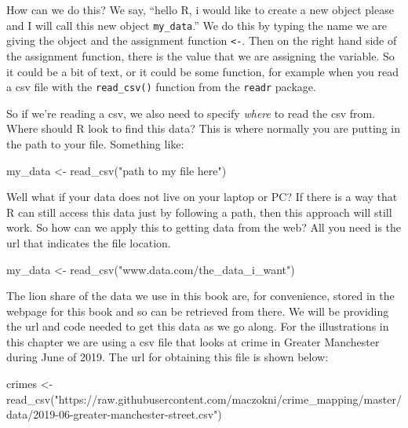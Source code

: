 \documentclass[
]{book}
\newenvironment{Shaded}{\begin{snugshade}}{\end{snugshade}}
\newcommand{\FunctionTok}[1]{\textcolor[rgb]{0.00,0.00,0.00}{#1}}
\newcommand{\NormalTok}[1]{#1}
\newcommand{\OtherTok}[1]{\textcolor[rgb]{0.56,0.35,0.01}{#1}}
\newcommand{\StringTok}[1]{\textcolor[rgb]{0.31,0.60,0.02}{#1}}
\begin{document}
How can we do this? We say, ``hello R, i would like to create a new object please and I will call this new object \texttt{my\_data}.'' We do this by typing the name we are giving the object and the assignment function \texttt{\textless{}-}. Then on the right hand side of the assignment function, there is the value that we are assigning the variable. So it could be a bit of text, or it could be some function, for example when you read a csv file with the \texttt{read\_csv()} function from the \texttt{readr} package.

So if we're reading a csv, we also need to specify \emph{where} to read the csv from. Where should R look to find this data? This is where normally you are putting in the path to your file. Something like:

\begin{Shaded}
\begin{Highlighting}[]
\NormalTok{my\_data }\OtherTok{\textless{}{-}} \FunctionTok{read\_csv}\NormalTok{(}\StringTok{"path to my file here"}\NormalTok{)}
\end{Highlighting}
\end{Shaded}

Well what if your data does not live on your laptop or PC? If there is a way that R can still access this data just by following a path, then this approach will still work. So how can we apply this to getting data from the web? All you need is the url that indicates the file location.

\begin{Shaded}
\begin{Highlighting}[]
\NormalTok{my\_data }\OtherTok{\textless{}{-}} \FunctionTok{read\_csv}\NormalTok{(}\StringTok{"www.data.com/the\_data\_i\_want"}\NormalTok{)}
\end{Highlighting}
\end{Shaded}

The lion share of the data we use in this book are, for convenience, stored in the webpage for this book and so can be retrieved from there. We will be providing the url and code needed to get this data as we go along. For the illustrations in this chapter we are using a csv file that looks at crime in Greater Manchester during June of 2019. The url for obtaining this file is shown below:

\begin{Shaded}
\begin{Highlighting}[]
\NormalTok{crimes }\OtherTok{\textless{}{-}} \FunctionTok{read\_csv}\NormalTok{(}\StringTok{"https://raw.githubusercontent.com/maczokni/crime\_mapping/master/data/2019{-}06{-}greater{-}manchester{-}street.csv"}\NormalTok{)}
\end{Highlighting}
\end{Shaded}
\end{document}

